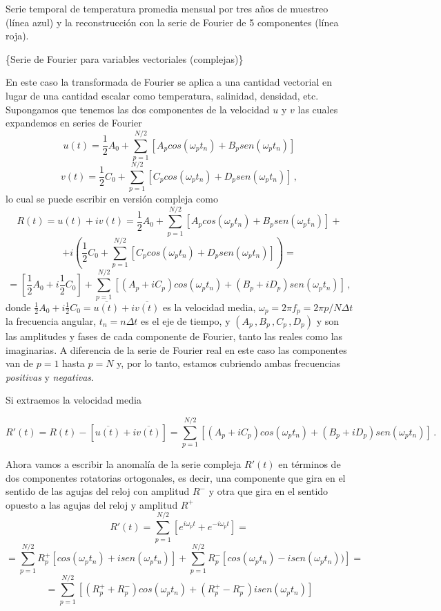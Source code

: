 \documentclass[
]{agujournal2019}
\begin{document}
\begin{center}
\end{center}
\begin{center}
Serie temporal de temperatura promedia mensual por tres años de muestreo (línea azul)
y la reconstrucción con la serie de Fourier de 5 componentes (línea roja).
\end{center}

\vspace{0.25cm}

\{\textbf \large Serie de Fourier para variables vectoriales
(complejas)\}

En este caso la transformada de Fourier se aplica a una cantidad
vectorial en lugar de una cantidad escalar como temperatura, salinidad,
densidad, etc. Supongamos que tenemos las dos componentes de la
velocidad \(u\) y \(v\) las cuales expandemos en series de Fourier
\[u(t)=\frac{1}{2}A_0+\sum\limits^{N/2}_{p=1}[A_p cos(\omega_p t_n) + B_p sen(\omega_p t_n)]\]
\[v(t)=\frac{1}{2}C_0+\sum\limits^{N/2}_{p=1}[C_p cos(\omega_p t_n) + D_p sen(\omega_p t_n)]\,,\]
lo cual se puede escribir en versión compleja como
\[R(t)=u(t)+i v(t)=\frac{1}{2}A_0+\sum\limits^{N/2}_{p=1}[A_p cos(\omega_p t_n) + B_p sen(\omega_p t_n)]
+\]
\[+ i \left(\frac{1}{2}C_0+\sum\limits^{N/2}_{p=1}[C_p cos(\omega_p t_n) + D_p sen(\omega_p t_n)]\right)=\]
\[=\left[\frac{1}{2}A_0 + i \frac{1}{2}C_0\right] + \sum\limits^{N/2}_{p=1} \left[ (A_p + iC_p) cos(\omega_p t_n) + (B_p + i D_p) sen(\omega_p t_n) \right]\,,\]
donde
\(\frac{1}{2}A_0 + i \frac{1}{2}C_0=\overline{u(t)} +i \overline{v(t)}\)
es la velocidad media, \(\omega_p=2\pi f_p=2\pi p/N\Delta t\) la
frecuencia angular, \(t_n=n\Delta t\) es el eje de tiempo, y
\((A_p\,,B_p\,,C_p\,,D_p)\) y son las amplitudes y fases de cada
componente de Fourier, tanto las reales como las imaginarias. A
diferencia de la serie de Fourier real en este caso las componentes van
de \(p=1\) hasta \(p=N\) y, por lo tanto, estamos cubriendo ambas
frecuencias \emph{positivas} y \emph{negativas}.

Si extraemos la velocidad media

\[R'(t)=R(t)-[\overline{u(t)} +i \overline{v(t)}]=\sum\limits^{N/2}_{p=1} \left[ (A_p + iC_p) cos(\omega_p t_n) + (B_p + i D_p) sen(\omega_p t_n) \right]\,.\]

Ahora vamos a escribir la anomalía de la serie compleja \(R'(t)\) en
términos de dos componentes rotatorias ortogonales, es decir, una
componente que gira en el sentido de las agujas del reloj con amplitud
\(R^{-}\) y otra que gira en el sentido opuesto a las agujas del reloj y
amplitud \(R^{+}\)
\[R'(t)=\sum\limits^{N/2}_{p=1} \left[ e^{i\omega_p t} + e^{-i\omega_p t}\right]=\]
\[    =\sum\limits^{N/2}_{p=1}  R_p^{+}\left[cos\left(\omega_p t_n\right) + i sen\left(\omega_p t_n\right )\right] +
       \sum\limits^{N/2}_{p=1}  R_p^{-}\left[cos\left(\omega_p t_n\right) - i sen\left(\omega_p t_n\right))\right]=\]
\[=\sum\limits^{N/2}_{p=1}\left[ (R_p^+ + R_p^{-})cos\left(\omega_p t_n\right) + (R_p^+ - R_p^{-})i sen\left(\omega_p t_n\right) \right]\]
\end{document}
